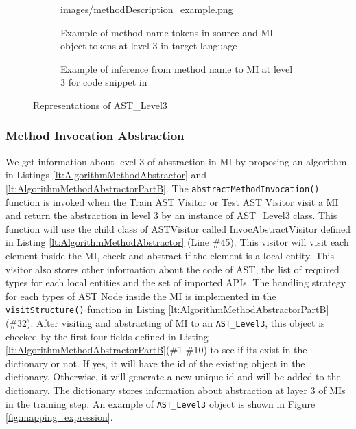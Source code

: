 \begin{figure}
\begin{subfigure}[t]{0.23\textwidth}
{        {images/methodDescription_example.png}}
        \caption{Example of method name tokens in source and MI object tokens at level 3 in target language}
        \label{fig:method_desc_example}
      \end{subfigure}
      \hfill
      \begin{subfigure}{0.5\textwidth}
        \caption{\label{fig:example_in} Example of inference from method name to MI at level 3 for code snippet in \cite{id:IntrinsicAndroidExample}}
      \end{subfigure}
\caption{
\label{fig:CombineImageOfASTLevel3}%
Representations of AST\_Level3}
\end{figure}

\subsubsection{Method Invocation Abstraction}

We get information about level 3 of abstraction in MI by proposing an algorithm in Listings \ref{lt:AlgorithmMethodAbstractor} and \ref{lt:AlgorithmMethodAbstractorPartB}. The \texttt{abstractMethodInvocation()} function is invoked when the Train AST Visitor or Test AST Visitor visit a MI and return the abstraction in level 3 by an instance of AST\_Level3 class. This function will use the child class of ASTVisitor called InvocAbstractVisitor defined in Listing \ref{lt:AlgorithmMethodAbstractor} (Line \#45). This visitor will visit each element inside the MI, check and abstract if the element is a local entity. This visitor also stores other information about the code of AST, the list of required types for each local entities and the set of imported APIs. The handling strategy for each types of AST Node inside the MI is implemented in the \texttt{visitStructure()} function in  Listing \ref{lt:AlgorithmMethodAbstractorPartB}(\#32). After visiting and abstracting of MI to an \texttt{AST\_Level3}, this object is checked by the first four fields defined in Listing \ref{lt:AlgorithmMethodAbstractorPartB}(\#1-\#10)  to see if its exist in the dictionary or not. If yes, it will have the id of the existing object in the dictionary. Otherwise, it will generate a new unique id and will be added to the dictionary. The dictionary stores information about abstraction at layer 3 of MIs in the training step. An example of  \texttt{AST\_Level3} object is shown in Figure \ref{fig:mapping_expression}.


